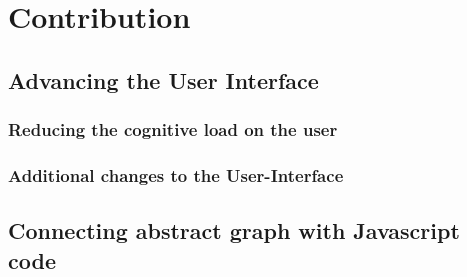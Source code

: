\chapter{Contribution}
\section{Advancing the User Interface}

	\subsection{Reducing the cognitive load on the user}
	
	\subsection{Additional changes to the User-Interface}
	
\section{Connecting abstract graph with Javascript code}
	
